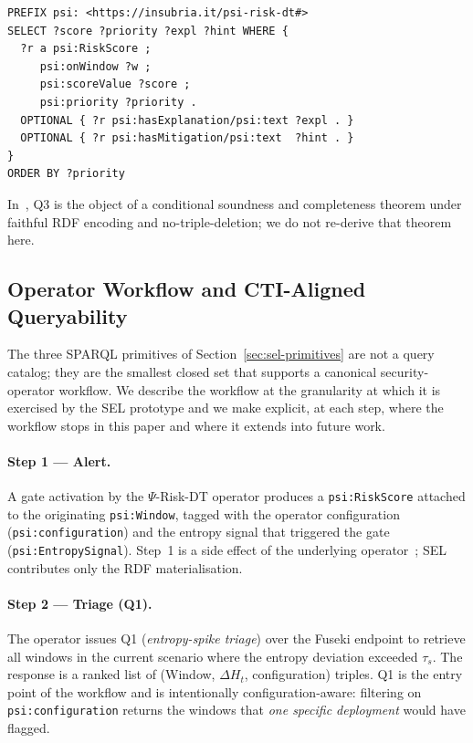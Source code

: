 \documentclass[runningheads]{llncs}
\newcommand{\psiop}{\ensuremath{\Psi}}
\newcommand{\EntropyDeviation}{\ensuremath{\Delta H}}
\newcommand{\taus}{\ensuremath{\tau_{s}}}
\begin{document}
\begin{lstlisting}[language=SPARQL]
PREFIX psi: <https://insubria.it/psi-risk-dt#>
SELECT ?score ?priority ?expl ?hint WHERE {
  ?r a psi:RiskScore ;
     psi:onWindow ?w ;
     psi:scoreValue ?score ;
     psi:priority ?priority .
  OPTIONAL { ?r psi:hasExplanation/psi:text ?expl . }
  OPTIONAL { ?r psi:hasMitigation/psi:text  ?hint . }
}
ORDER BY ?priority
\end{lstlisting}

In~\cite{paper5}, Q3 is the object of a conditional soundness and
completeness theorem under faithful RDF encoding and no-triple-deletion;
we do not re-derive that theorem here.

\subsection{Operator Workflow and CTI-Aligned Queryability}
\label{sec:sel-workflow}

The three SPARQL primitives of
Section~\ref{sec:sel-primitives} are not a query catalog; they are the
smallest closed set that supports a canonical security-operator
workflow. We describe the workflow at the granularity at which it is
exercised by the SEL prototype and we make explicit, at each step,
where the workflow stops in this paper and where it extends into future
work.

\paragraph{Step 1 --- Alert.} A gate activation by the $\psiop$-Risk-DT
operator produces a \texttt{psi:RiskScore} attached to the originating
\texttt{psi:Window}, tagged with the operator configuration
(\texttt{psi:configuration}) and the entropy signal that triggered the
gate (\texttt{psi:EntropySignal}). Step~1 is a side effect of the
underlying operator~\cite{paper3}; SEL contributes only the RDF
materialisation.

\paragraph{Step 2 --- Triage (Q1).} The operator issues Q1
(\emph{entropy-spike triage}) over the Fuseki endpoint to retrieve all
windows in the current scenario where the entropy deviation exceeded
$\taus$. The response is a ranked list of
(Window, $\EntropyDeviation_t$, configuration) triples. Q1 is the entry point of the
workflow and is intentionally configuration-aware: filtering on
\texttt{psi:configuration} returns the windows that \emph{one specific
deployment} would have flagged.
\end{document}
